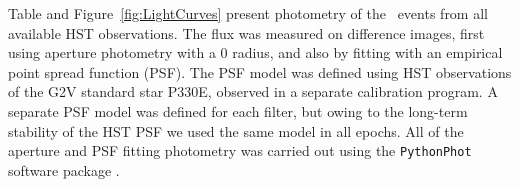 Table  %
and Figure~\ref{fig:LightCurves} present 
photometry of the \spock\ events
from all available HST observations. The flux was measured on
difference images, first using aperture photometry with a 0
radius, and also by fitting with an empirical point spread function
(PSF).  The PSF model was defined using HST observations of the G2V
standard star P330E, observed in a separate calibration program.  A
separate PSF model was defined for each filter, but owing to the
long-term stability of the HST PSF we used the same model in all
epochs.  All of the aperture and PSF fitting photometry was carried
out using the {\tt PythonPhot} software package \citep{Jones:2015}.

